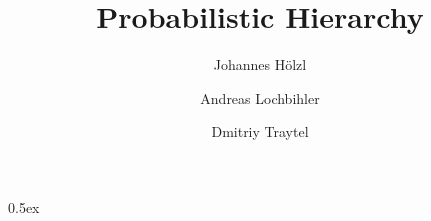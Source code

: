 \documentclass[11pt,a4paper]{article}
\begin{document}
\title{Probabilistic Hierarchy}
\author{Johannes H\"olzl \and Andreas Lochbihler \and Dmitriy Traytel}
\maketitle

\tableofcontents

\parindent 0pt\parskip 0.5ex




%
%
\end{document}

